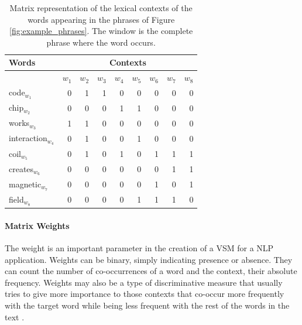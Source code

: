 \begin{table}[]
\centering
\caption{Matrix representation of the lexical contexts of the words appearing in the phrases of Figure \ref{fig:example_phrases}. The window is the complete phrase where the word occurs.}
\label{tab:lexical_matrix}
\begin{tabular}{@{}lrrrrrrrr@{}}
\toprule
 Words & \multicolumn{8}{c}{Contexts} \\ \midrule
       & $w_1$ & $w_2$ & $w_3$ & $w_4$ & $w_5$ & $w_6$ & $w_7$ & $w_8$ \\ \midrule
code$_{w_1}$        & 0    & 1    & 1     & 0           & 0    & 0       & 0        & 0     \\
chip$_{w_2}$        & 0    & 0    & 0     & 1           & 1    & 0       & 0        & 0     \\
works$_{w_3}$       & 1    & 1    & 0     & 0           & 0    & 0       & 0        & 0     \\
interaction$_{w_4}$ & 0    & 1    & 0     & 0           & 1    & 0       & 0        & 0     \\
coil$_{w_5}$        & 0    & 1    & 0     & 1           & 0    & 1       & 1        & 1     \\
creates$_{w_6}$     & 0    & 0    & 0     & 0           & 0    & 0       & 1        & 1     \\
magnetic$_{w_7}$    & 0    & 0    & 0     & 0           & 0    & 1       & 0        & 1     \\
field$_{w_8}$       & 0    & 0    & 0     & 0           & 1    & 1       & 1        & 0     \\ \bottomrule
\end{tabular}
\end{table}

\paragraph{Matrix Weights}

The weight is an important parameter in the creation of a VSM for a NLP application. Weights can be binary, simply  indicating presence or absence. They can count the number of co-occurrences of a word and the context, their absolute frequency. Weights may also be a type of discriminative measure that usually tries to give more importance to those contexts that co-occur more frequently with the target word while being less frequent  with the rest of the words in the text \cite{JurafskyM09,ClarkBook2010}.  

